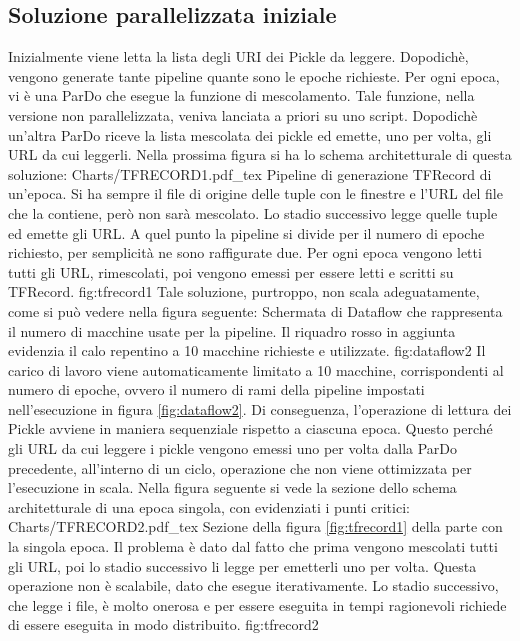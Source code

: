 \subsection{Soluzione parallelizzata iniziale}
Inizialmente viene letta la lista degli URI dei Pickle da leggere. Dopodichè, vengono generate tante pipeline quante sono le epoche richieste. Per ogni epoca, vi è una ParDo che esegue la funzione di mescolamento. Tale funzione, nella versione non parallelizzata, veniva lanciata a priori su uno script. Dopodichè un’altra ParDo riceve la lista mescolata dei pickle ed emette, uno per volta, gli URL da cui leggerli. Nella prossima figura si ha lo schema architetturale di questa soluzione:
\svg
{Charts/TFRECORD1.pdf_tex}
{Pipeline di generazione TFRecord di un'epoca. Si ha sempre il file di origine delle tuple con le finestre e l'URL del file che la contiene, però non sarà mescolato. Lo stadio successivo legge quelle tuple ed emette gli URL. A quel punto la pipeline si divide per il numero di epoche richiesto, per semplicità ne sono raffigurate due. Per ogni epoca vengono letti tutti gli URL, rimescolati, poi vengono emessi per essere letti e scritti su TFRecord. }
{fig:tfrecord1}
 Tale soluzione, purtroppo, non scala adeguatamente, come si può vedere nella figura seguente:
{Schermata di Dataflow che rappresenta il numero di macchine usate per la pipeline. Il riquadro rosso in aggiunta evidenzia il calo repentino a 10 macchine richieste e utilizzate. }
{fig:dataflow2}
Il carico di lavoro viene automaticamente limitato a 10 macchine, corrispondenti al numero di epoche, ovvero il numero di rami della pipeline impostati nell'esecuzione in figura \ref{fig:dataflow2}. Di conseguenza, l'operazione di lettura dei Pickle avviene in maniera sequenziale rispetto a ciascuna epoca. Questo perché gli URL da cui leggere i pickle vengono emessi uno per volta dalla ParDo precedente, all’interno di un ciclo, operazione che non viene ottimizzata per l’esecuzione in scala. Nella figura seguente si vede la sezione dello schema architetturale di una epoca singola, con evidenziati i punti critici:
\svg
{Charts/TFRECORD2.pdf_tex}
{ Sezione della figura \ref{fig:tfrecord1} della parte con la singola epoca. Il problema è dato dal fatto che prima vengono mescolati tutti gli URL, poi lo stadio successivo li legge per emetterli uno per volta. Questa operazione non è scalabile, dato che esegue iterativamente. Lo stadio successivo, che legge i file, è molto onerosa e per essere eseguita in tempi ragionevoli richiede di essere eseguita in modo distribuito. }
{fig:tfrecord2}
